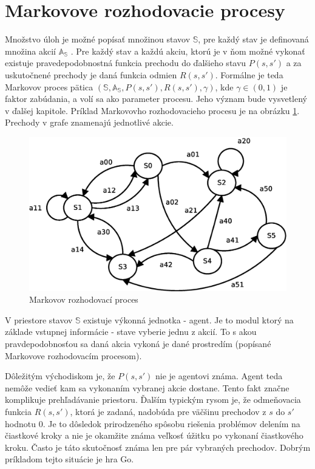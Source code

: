 \section{Markovove rozhodovacie procesy}


Množstvo úloh je možné popísať množinou stavov $\mathbb{S}$, pre každý stav je definovaná množina akcií
$\mathbb{A_S}$ \cite{bib:markov_01} \cite{bib:markov_02}. Pre každý stav a každú akciu, ktorú je v ňom možné vykonať existuje pravedepodobnostná
funkcia prechodu do ďalšieho stavu $P(s, s')$ a za uskutočnené prechody je daná funkcia odmien $R(s, s')$.
Formálne je teda Markovov proces pätica $(\mathbb{S}, \mathbb{A_S}, P(s, s'), R(s, s'), \gamma )$,
kde $\gamma \in (0, 1)$ je faktor zabúdania, a volí sa ako parameter procesu. Jeho význam bude vysvetlený
v ďalšej kapitole. Príklad Markovovho rozhodovacieho procesu je na obrázku \ref{img:markovov_decision_process}.
Prechody v grafe znamenajú jednotlivé akcie.

\begin{figure}[!htb]
\center
\includegraphics[scale=.5]{../diagrams/markovov_process.eps}
\caption{Markovov rozhodovací proces}
\label{img:markovov_decision_process}
\end{figure}

V priestore stavov $\mathbb{S}$ existuje výkonná jednotka - agent. Je to modul
ktorý na základe vstupnej informácie - stave vyberie jednu z akcií. To s akou pravdepodobnosťou
sa daná akcia vykoná je dané prostredím (popísané Markovove rozhodovacím procesom).

Dôležitým východiskom je, že $P(s, s')$ nie je agentovi známa. Agent teda nemôže
vedieť kam sa vykonaním vybranej akcie dostane. Tento fakt značne komplikuje prehľadávanie
priestoru.
Ďalším typickým rysom je, že odmeňovacia funkcia $R(s, s')$, ktorá je zadaná,
nadobúda pre väčšinu prechodov z $s$ do $s'$ hodnotu 0. Je to dôsledok prirodzeného
spôsobu riešenia problémov delením na čiastkové kroky a nie je okamžite známa
veľkosť úžitku po vykonaní čiastkového kroku. Často je táto skutočnosť známa
len pre pár vybraných prechodov.
Dobrým príkladom tejto situácie je hra Go.

